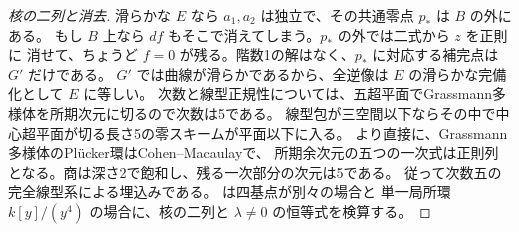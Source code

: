 \begin{proof}[核の二列と消去]
滑らかな $E$ なら $a_1,a_2$ は独立で、その共通零点 $p_*$ は $B$ の外にある。
もし $B$ 上なら $df$ もそこで消えてしまう。$p_*$ の外では二式から $z$ を正則に
消せて、ちょうど $f=0$ が残る。階数1の解はなく、$p_*$ に対応する補完点は $G'$ だけである。
$G'$ では曲線が滑らかであるから、全逆像は $E$ の滑らかな完備化として $E$ に等しい。
次数と線型正規性については、五超平面でGrassmann多様体を所期次元に切るので次数は5である。
線型包が三空間以下ならその中で中心超平面が切る長さ5の零スキームが平面以下に入る。
より直接に、Grassmann多様体のPl\"ucker環はCohen--Macaulayで、
所期余次元の五つの一次式は正則列となる。商は深さ2で飽和し、残る一次部分の次元は5である。
従って次数五の完全線型系による埋込みである。
 は四基点が別々の場合と
単一局所環 $k[y]/(y^4)$ の場合に、核の二列と $\lambda\ne0$ の恒等式を検算する。
\end{proof}
